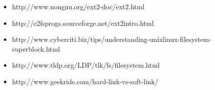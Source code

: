 \vspace{0.3cm}

\begin{itemize}
\item http://www.nongnu.org/ext2-doc/ext2.html
\item http://e2fsprogs.sourceforge.net/ext2intro.html
\item http://www.cyberciti.biz/tips/understanding-unixlinux-filesystem-superblock.html
\item http://www.tldp.org/LDP/tlk/fs/filesystem.html
\item http://www.geekride.com/hard-link-vs-soft-link/
\end{itemize}




